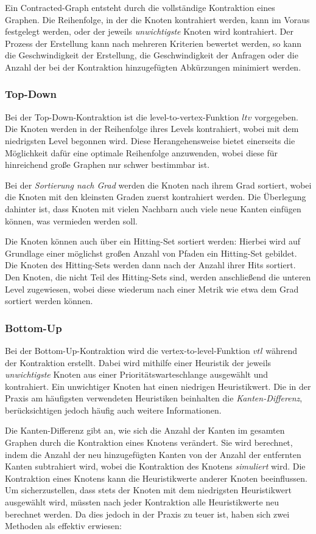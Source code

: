 Ein Contracted-Graph entsteht durch die vollständige Kontraktion eines Graphen.
Die Reihenfolge, in der die Knoten kontrahiert werden, kann im Voraus festgelegt werden, oder der jeweils \emph{unwichtigste} Knoten wird kontrahiert.
Der Prozess der Erstellung kann nach mehreren Kriterien bewertet werden, so kann die Geschwindigkeit der Erstellung, die Geschwindigkeit der Anfragen oder die Anzahl der bei der Kontraktion hinzugefügten Abkürzungen minimiert werden.

\subsubsection{Top-Down}
Bei der Top-Down-Kontraktion ist die level-to-vertex-Funktion ${ltv}$ vorgegeben.
Die Knoten werden in der Reihenfolge ihres Levels kontrahiert, wobei mit dem niedrigsten Level begonnen wird.
Diese Herangehensweise bietet einerseits die Möglichkeit dafür eine optimale Reihenfolge anzuwenden, wobei diese für hinreichend große Graphen nur schwer bestimmbar ist.

Bei der \emph{Sortierung nach Grad} werden die Knoten nach ihrem Grad sortiert, wobei die Knoten mit den kleinsten Graden zuerst kontrahiert werden.
Die Überlegung dahinter ist, dass Knoten mit vielen Nachbarn auch viele neue Kanten einfügen können, was vermieden werden soll.

Die Knoten können auch über ein Hitting-Set sortiert werden:
Hierbei wird auf Grundlage einer möglichst großen Anzahl von Pfaden ein Hitting-Set gebildet.
Die Knoten des Hitting-Sets werden dann nach der Anzahl ihrer Hits sortiert.
Den Knoten, die nicht Teil des Hitting-Sets sind, werden anschließend die unteren Level zugewiesen, wobei diese wiederum nach einer Metrik wie etwa dem Grad sortiert werden können.

\subsubsection{Bottom-Up}

Bei der Bottom-Up-Kontraktion wird die vertex-to-level-Funktion ${vtl}$ während der Kontraktion erstellt.
Dabei wird mithilfe einer Heuristik der jeweils \emph{unwichtigste} Knoten aus einer Prioritätswarteschlange ausgewählt und kontrahiert.
Ein unwichtiger Knoten hat einen niedrigen Heuristikwert.
Die in der Praxis am häufigsten verwendeten Heuristiken beinhalten die \emph{Kanten-Differenz}, berücksichtigen jedoch häufig auch weitere Informationen.

Die Kanten-Differenz gibt an, wie sich die Anzahl der Kanten im gesamten Graphen durch die Kontraktion eines Knotens verändert.
Sie wird berechnet, indem die Anzahl der neu hinzugefügten Kanten von der Anzahl der entfernten Kanten subtrahiert wird, wobei die Kontraktion des Knotens \emph{simuliert} wird.
Die Kontraktion eines Knotens kann die Heuristikwerte anderer Knoten beeinflussen.
Um sicherzustellen, dass stets der Knoten mit dem niedrigsten Heuristikwert ausgewählt wird, müssten nach jeder Kontraktion alle Heuristikwerte neu berechnet werden.
Da dies jedoch in der Praxis zu teuer ist, haben sich zwei Methoden als effektiv erwiesen:

